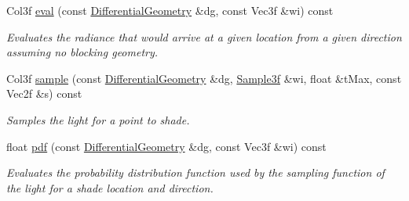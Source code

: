 \begin{DoxyCompactItemize}
Col3f \hyperlink{classembree_1_1_triangle_light_afa7279779945284d960d42427445d405}{eval} (const \hyperlink{structembree_1_1_differential_geometry}{DifferentialGeometry} \&dg, const Vec3f \&wi) const 
\begin{DoxyCompactList}\small\item\em Evaluates the radiance that would arrive at a given location from a given direction assuming no blocking geometry. \item\end{DoxyCompactList}\item 
Col3f \hyperlink{classembree_1_1_triangle_light_a3bf331c747d07fb3c60e50c066c631b9}{sample} (const \hyperlink{structembree_1_1_differential_geometry}{DifferentialGeometry} \&dg, \hyperlink{structembree_1_1_sample}{Sample3f} \&wi, float \&tMax, const Vec2f \&s) const 
\begin{DoxyCompactList}\small\item\em Samples the light for a point to shade. \item\end{DoxyCompactList}\item 
float \hyperlink{classembree_1_1_triangle_light_a74999d99d8c5876afd3a9ddc5acc41ad}{pdf} (const \hyperlink{structembree_1_1_differential_geometry}{DifferentialGeometry} \&dg, const Vec3f \&wi) const 
\begin{DoxyCompactList}\small\item\em Evaluates the probability distribution function used by the sampling function of the light for a shade location and direction. \item\end{DoxyCompactList}\end{DoxyCompactItemize}
